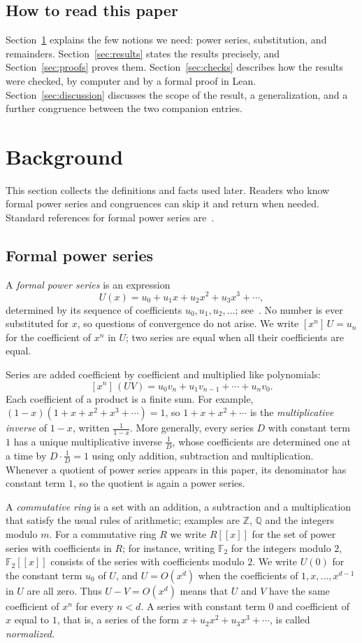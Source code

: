 \documentclass[11pt,a4paper]{article}
\theoremstyle{definition}
\theoremstyle{remark}
\newcommand{\Z}{\mathbb{Z}}
\newcommand{\Q}{\mathbb{Q}}
\newcommand{\F}{\mathbb{F}}
\newcommand{\ps}[1]{#1[[x]]}
\newcommand{\coeff}[2]{[x^{#1}]\,#2}
\begin{document}
\subsection{How to read this paper}
Section~\ref{sec:background} explains the few notions we need: power series, substitution, and remainders.
Section~\ref{sec:results} states the results precisely, and Section~\ref{sec:proofs} proves them.
Section~\ref{sec:checks} describes how the results were checked, by computer and by a formal proof in Lean.
Section~\ref{sec:discussion} discusses the scope of the result, a generalization, and a further congruence between the
two companion entries.
\section{Background}\label{sec:background}
This section collects the definitions and facts used later. Readers who know formal power series and congruences can skip it and return when needed. Standard references for formal power series are~\cite{niven,stanley}.
\subsection{Formal power series}
A \emph{formal power series} is an expression
\[
U(x)=u_0+u_1x+u_2x^2+u_3x^3+\cdots ,
\]
determined by its sequence of coefficients $u_0,u_1,u_2,\dots$; see~\cite{niven,stanley}. No number is ever
substituted for $x$, so questions of convergence do not arise. We write $\coeff{n}{U}=u_n$ for the coefficient of $x^n$ in $U$; two series are equal
when all their coefficients are equal.

Series are added coefficient by coefficient and multiplied like polynomials:
\[
\coeff{n}{(UV)}=u_0v_n+u_1v_{n-1}+\cdots+u_nv_0 .
\]
Each coefficient of a product is a finite sum. For example, $(1-x)(1+x+x^2+x^3+\cdots)=1$, so $1+x+x^2+\cdots$ is
the \emph{multiplicative inverse} of $1-x$, written $\frac{1}{1-x}$. More generally, every series $D$ with constant term
$1$ has a unique multiplicative inverse $\frac1D$, whose coefficients are determined one at a time by $D\cdot\frac1D=1$
using only addition, subtraction and multiplication. Whenever a quotient of power series appears in this paper, its
denominator has constant term $1$, so the quotient is again a power series.

A \emph{commutative ring} is a set with an addition, a subtraction and a multiplication that satisfy the usual rules
of arithmetic; examples are $\Z$, $\Q$ and the integers modulo $m$. For a commutative ring $R$ we write $\ps{R}$ for
the set of power series with coefficients in $R$; for instance, writing $\F_2$ for the integers modulo $2$, $\ps{\F_2}$
consists of the series with coefficients modulo $2$. We write
$U(0)$ for the constant term $u_0$ of $U$, and $U=O(x^d)$ when the coefficients of $1,x,\dots,x^{d-1}$ in $U$ are all
zero. Thus $U-V=O(x^d)$ means that $U$ and $V$ have the same coefficient of $x^n$ for every $n<d$. A series with
constant term $0$ and coefficient of $x$ equal to $1$, that is, a series of the form $x+u_2x^2+u_3x^3+\cdots$, is
called \emph{normalized}.
\end{document}
